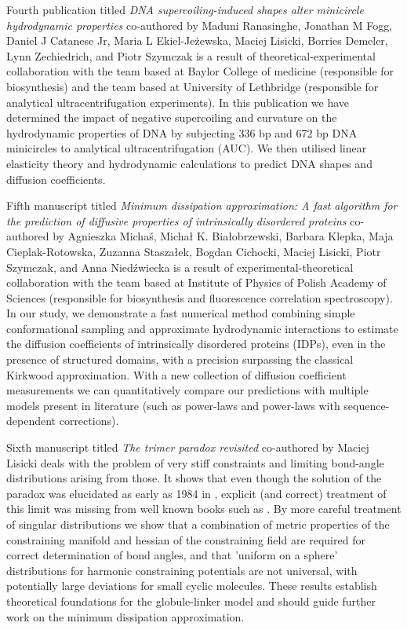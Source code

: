 \documentclass{doctoral}
\begin{document}
Fourth publication titled \emph{DNA supercoiling-induced shapes alter minicircle hydrodynamic properties} co-authored by Maduni Ranasinghe, Jonathan M Fogg, Daniel J Catanese Jr, Maria L Ekiel-Jeżewska, Maciej Lisicki, Borries Demeler, Lynn Zechiedrich, and Piotr Szymczak is a result of theoretical-experimental collaboration with the team based at Baylor College of medicine (responsible for biosynthesis) and the team based at University of Lethbridge (responsible for analytical ultracentrifugation experiments).
In this publication we have determined the impact of negative supercoiling and curvature on the hydrodynamic properties of DNA by subjecting 336 bp and 672 bp DNA minicircles to analytical ultracentrifugation (AUC).
We then utilised linear elasticity theory and hydrodynamic calculations to predict DNA shapes and diffusion coefficients.

Fifth manuscript titled \emph{Minimum dissipation approximation: A fast algorithm for the prediction of diffusive properties of intrinsically disordered proteins} co-authored by Agnieszka Michaś, Michał K.
Białobrzewski, Barbara Klepka, Maja Cieplak-Rotowska, Zuzanna Staszałek, Bogdan Cichocki, Maciej Lisicki, Piotr Szymczak, and Anna Niedźwiecka is a result of experimental-theoretical collaboration with the team based at Institute of Physics of Polish Academy of Sciences (responsible for biosynthesis and fluorescence correlation spectroscopy).
In our study, we demonstrate a fast numerical method combining simple conformational sampling and approximate hydrodynamic interactions to estimate the diffusion coefficients of intrinsically disordered proteins (IDPs), even in the presence of structured domains, with a precision surpassing the classical Kirkwood approximation.
With a new collection of diffusion coefficient measurements we can quantitatively compare our predictions with multiple models present in literature (such as power-laws and power-laws with sequence-dependent corrections).

Sixth manuscript titled \emph{The trimer paradox revisited} co-authored by Maciej Lisicki deals with the problem of very stiff constraints and limiting bond-angle distributions arising from those.
It shows that even though the solution of the paradox was elucidated as early as 1984 in \textcite{van_Kampen_1984}, explicit (and correct) treatment of this limit was missing from well known books such as \textcite{Frenkel_2002}.
By more careful treatment of singular distributions we show that a combination of metric properties of the constraining manifold and hessian of the constraining field are required for correct determination of bond angles, and that 'uniform on a sphere' distributions for harmonic constraining potentials are not universal, with potentially large deviations for small cyclic molecules.
These results establish theoretical foundations for the globule-linker model and should guide further work on the minimum dissipation approximation.
\end{document}

